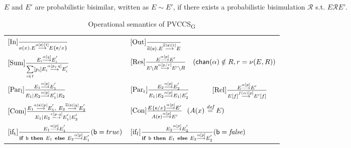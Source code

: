 \documentclass[10pt, conference, compsocconf]{IEEEtran}
\begin{document}
$E$ and $E'$ are probabilistic bisimilar, written as $E\sim E'$, if there exists a probabilistic bisimulation $\mathcal{R}$ s.t. $E\mathcal{R}E'$.
\begin{table*}
\centering
\renewcommand{\arraystretch}{1.5}
\caption{\label{operationalsemanticspvccsG}Operational semantics of PVCCS\textsubscript{G}}
\begin{tabular}{ll}\hline
$[{\rm In}]\frac{}{a(x).E\stackrel{a({\sf e})[1]} {\longrightarrow }E\{{\sf e}/x\}}$&
$[{\rm Out}]\frac{}{\overline{a}({\sf e}).E \stackrel{\overline{a}({\sf e})[1]}{\longrightarrow}E} $\\
$[{\rm Sum}] \frac{E_{\textit{i}}\stackrel{\alpha[q]}{\longrightarrow}E_{\textit{i}}^{'} }{\underset{i\in I}{\sum}[p_{\textit{i}}]E_{\textit{i}}\stackrel{\alpha[p_{\textit{i}}\cdot q]}{\longrightarrow}E_{\textit{i}}^{'}} $& $[{\rm Res}] \frac{E\stackrel{\alpha[p]}{\longrightarrow}E'}{E\backslash R\stackrel{\alpha[p/r]}{\longrightarrow}E'\backslash R} ~~~({\sf chan}(\alpha)\notin R, r=\nu(E,R)) $\\
$[{\rm {Par_l}}] \frac{E_1\stackrel{\alpha[p]}{\longrightarrow}E_1^{'}}{E_1|E_2\stackrel{\alpha [p]}{\longrightarrow}E_1^{'}|E_2}$&
$[{\rm Par_r}] \frac{E_2\stackrel{\alpha[p]}{\longrightarrow}E_2^{'}}{E_1|E_2\stackrel{\alpha [p]}{\longrightarrow}E_1|E_2^{'}} $ ~~~~~
$[{\rm Rel}] \frac{E\stackrel{\alpha[p]}{\longrightarrow}E'}{E[f]\stackrel{f(\alpha)[p]}{\longrightarrow}E'[f]}$\\
$[{\rm Com}]\frac{E_1\stackrel{a({\sf e})[p]}{\longrightarrow}E_1^{'},~ E_2\stackrel {\overline{a}({\sf e})[q]}{\longrightarrow}E_2^{'}}{E_1|E_2\stackrel{\tau[p\cdot q]}{\longrightarrow}E_1^{'}|E_2^{'}}$ & $[{\rm Con}]\frac{E\{{\sf e}/x\}\stackrel{\alpha[p]}{\longrightarrow} E'}{A({\sf e})\stackrel{\alpha[p]}{\longrightarrow}E'}~~(A(x)\stackrel{\textit{def}} {=}E)$\\
$[{\rm if_t}]\frac{E_{1}\stackrel{\alpha[p]}{\longrightarrow}E_{1}^{'}} {{\rm {\bf if}}~{\sf b}~{\rm {\bf then}}~E_1~{\rm {\bf else}}~E_2\stackrel{\alpha[p]} {\longrightarrow}E_{1}^{'}}({\sf b}=true)  $ & $ [{\rm if_f}]\frac{E_{2}\stackrel{\alpha[p]}{\longrightarrow}E_{2}^{'}} {{\rm {\bf if}}~{\sf b}~{\rm {\bf then}}~E_1~{\rm {\bf else}}~E_2\stackrel{\alpha[p]} {\longrightarrow}E_{2}^{'}}({\sf b}=\textit{false})  $\\
\hline
\end{tabular}
\end{table*}
\end{document}
